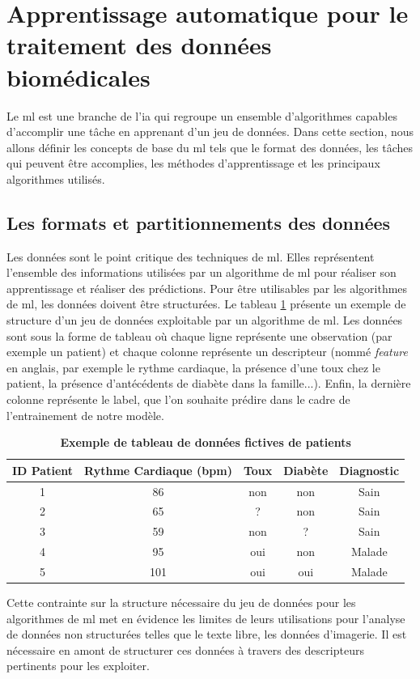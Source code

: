 \section{Apprentissage automatique pour le traitement des données biomédicales}
Le \gls{ml} est une branche de l'\gls{ia} qui regroupe un ensemble d'algorithmes capables d'accomplir une tâche en apprenant d'un jeu de données. Dans cette section, nous allons définir les concepts de base du \gls{ml} tels que le format des données, les tâches qui peuvent être accomplies, les méthodes d'apprentissage et les principaux algorithmes utilisés.

\subsection{Les formats et partitionnements des données}
Les données sont le point critique des techniques de \gls{ml}. Elles représentent l'ensemble des informations utilisées par un algorithme de \gls{ml} pour réaliser son apprentissage et réaliser des prédictions. Pour être utilisables par les algorithmes de \gls{ml}, les données doivent être structurées. Le tableau \ref{table:dataset_intro} présente un exemple de structure d'un jeu de données exploitable par un algorithme de \gls{ml}. Les données sont sous la forme de tableau où chaque ligne représente une observation (par exemple un patient) et chaque colonne représente un descripteur (nommé \textit{feature} en anglais, par exemple le rythme cardiaque, la présence d'une toux chez le patient, la présence d'antécédents de diabète dans la famille...). Enfin, la dernière colonne représente le label, que l'on souhaite prédire dans le cadre de l'entrainement de notre modèle.
\begin{table}[!ht]
\centering
\begin{tabular}{|c|c|c|c|c|} 
 \hline
 ID Patient & Rythme Cardiaque (bpm) & Toux & Diabète & Diagnostic \\
 \hline
 1 & 86 & non & non & Sain \\ 
 2 & 65 & ? & non & Sain \\ 
 3 & 59 & non & ? & Sain \\ 
 4 & 95 & oui & non & Malade \\ 
 5 & 101 & oui & oui & Malade\\ 
 \hline
\end{tabular}
\caption[Exemple de tableau de données fictives de patients]{\textbf{Exemple de tableau de données fictives de patients}}
\label{table:dataset_intro}
\end{table}
Cette contrainte sur la structure nécessaire du jeu de données pour les algorithmes de \gls{ml} met en évidence les limites de leurs utilisations pour l'analyse de données non structurées telles que le texte libre, les données d'imagerie. Il est nécessaire en amont de structurer ces données à travers des descripteurs pertinents pour les exploiter.

